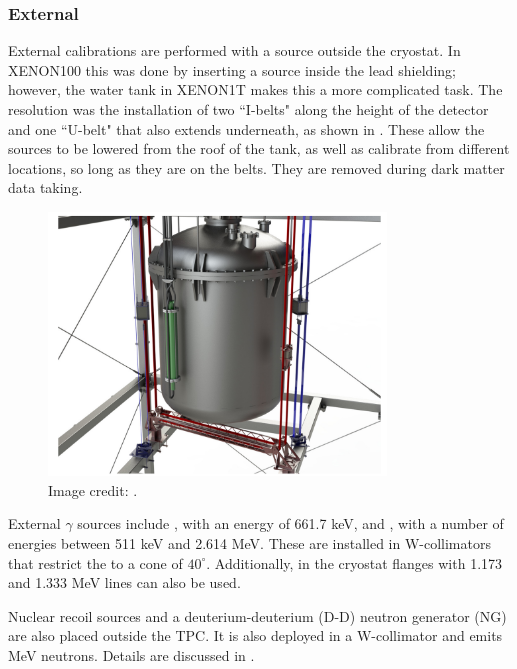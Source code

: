 \subsubsection{External}
\label{subsubsec:xenon1t_calibrations_external}
External calibrations are performed with a source outside the cryostat.  In XENON100 this was done by inserting a source inside the lead
shielding; however, the water tank in XENON1T makes this a more complicated task.  The resolution was the installation of two ``I-belts"
along the height of the detector and one ``U-belt" that also extends underneath, as shown in
.  These
allow the sources to be lowered from the roof of the tank, as well as calibrate from different locations, so long as they are on the
belts.  They are removed during dark matter data taking.

\begin{figure}
\centering
\includegraphics[width=0.8\textwidth]{TPCCalibrations}
\caption{Image credit: .}
\label{fig:xenon1t_calibrations_belts}
\end{figure}

External $\gamma$ sources include , with an energy of 661.7 keV, and , with a number of energies between 511 keV
and 2.614 MeV.  These are installed in W-collimators that restrict the \gammarays to a cone of $40^{\circ}$.  Additionally, 
in the cryostat flanges with 1.173 and 1.333 MeV lines can also be used.

Nuclear recoil sources \ambe and a deuterium-deuterium (D-D) neutron generator (NG) are also placed outside the TPC.  It is also deployed in a
W-collimator and emits MeV neutrons.  Details are discussed in .



